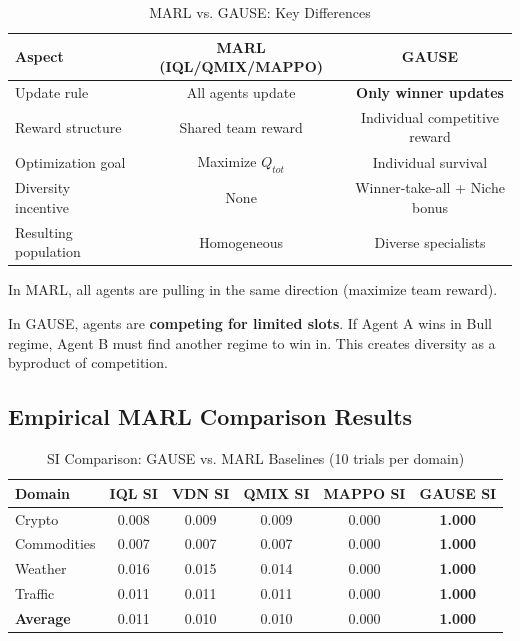 \documentclass[11pt,a4paper]{article}
\theoremstyle{definition}
\theoremstyle{plain}
\begin{document}
\begin{table}[h]
\centering
\caption{MARL vs. GAUSE: Key Differences}
\begin{tabular}{l|cc}
\toprule
Aspect & MARL (IQL/QMIX/MAPPO) & GAUSE \\
\midrule
Update rule & All agents update & \textbf{Only winner updates} \\
Reward structure & Shared team reward & Individual competitive reward \\
Optimization goal & Maximize $Q_{tot}$ & Individual survival \\
Diversity incentive & None & Winner-take-all + Niche bonus \\
Resulting population & Homogeneous & Diverse specialists \\
\bottomrule
\end{tabular}
\end{table}

\begin{intuition}
In MARL, all agents are pulling in the same direction (maximize team reward).

In GAUSE, agents are \textbf{competing for limited slots}. If Agent A wins in Bull regime, Agent B must find another regime to win in. This creates diversity as a byproduct of competition.
\end{intuition}

\subsection{Empirical MARL Comparison Results}

\begin{table}[h]
\centering
\caption{SI Comparison: GAUSE vs. MARL Baselines (10 trials per domain)}
\begin{tabular}{l|cccc|c}
\toprule
Domain & IQL SI & VDN SI & QMIX SI & MAPPO SI & GAUSE SI \\
\midrule
Crypto & 0.008 & 0.009 & 0.009 & 0.000 & \textbf{1.000} \\
Commodities & 0.007 & 0.007 & 0.007 & 0.000 & \textbf{1.000} \\
Weather & 0.016 & 0.015 & 0.014 & 0.000 & \textbf{1.000} \\
Traffic & 0.011 & 0.011 & 0.011 & 0.000 & \textbf{1.000} \\
\midrule
\textbf{Average} & 0.011 & 0.010 & 0.010 & 0.000 & \textbf{1.000} \\
\bottomrule
\end{tabular}
\end{table}
\end{document}
